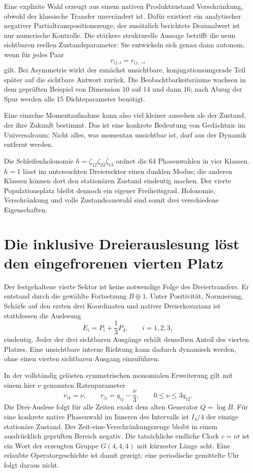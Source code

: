 Eine explizite Wahl erzeugt aus einem nativen Produktzustand Verschränkung, obwohl der klassische Transfer unverändert ist. Dafür existiert ein analytischer negativer Partialtranspositionszeuge; der zusätzlich berichtete Dezimalwert ist nur numerische Kontrolle. Die stärkere strukturelle Aussage betrifft die neun sichtbaren reellen Zustandsparameter: Sie entwickeln sich genau dann autonom, wenn für jedes Paar
\[
 r_{ij,i}=r_{ij,-i}
\]
gilt. Bei Asymmetrie wirkt der zunächst unsichtbare, konjugationsungerade Teil später auf die sichtbare Antwort zurück. Die Beobachtbarkeitsräume wachsen in dem geprüften Beispiel von Dimension $10$ auf $14$ und dann $16$; nach Abzug der Spur werden alle 15 Dichteparameter benötigt. 

Eine einzelne Momentaufnahme kann also viel kleiner aussehen als der Zustand, der ihre Zukunft bestimmt. Das ist eine konkrete Bedeutung von Gedächtnis im Universalraum: Nicht alles, was momentan unsichtbar ist, darf aus der Dynamik entfernt werden.

Die Schleifenholonomie $h=\zeta_{12}\zeta_{23}\overline{\zeta}_{13}$ ordnet die 64 Phasenwahlen in vier Klassen. $h=1$ lässt im untersuchten Dreiersektor einen dunklen Modus; die anderen Klassen können dort den stationären Zustand eindeutig machen. Der vierte Populationsplatz bleibt dennoch ein eigener Freiheitsgrad. Holonomie, Verschränkung und volle Zustandsauswahl sind somit drei verschiedene Eigenschaften. 

\section{Die inklusive Dreierauslesung löst den eingefrorenen vierten Platz}
Der festgehaltene vierte Sektor ist keine notwendige Folge des Dreiertransfers. Er entstand durch die gewählte Fortsetzung $B\oplus1$. Unter Positivität, Normierung, Schärfe auf den ersten drei Koordinaten und nativer Dreierkovarianz ist stattdessen die Auslesung
\[
 E_i=P_i+\frac13P_4,\qquad i=1,2,3,
\]
eindeutig. Jeder der drei sichtbaren Ausgänge erhält denselben Anteil des vierten Platzes. Eine unsichtbare interne Richtung kann dadurch dynamisch werden, ohne einen vierten sichtbaren Ausgang einzuführen. 

In der vollständig gelösten symmetrischen monomialen Erweiterung gilt mit einem hier $\nu$ genannten Ratenparameter
\[
 r_{i4}=\nu,\qquad r_{ij}=q_{ij}-\frac\nu3,\qquad
 0\le\nu\le3q_{12}.
\]
Die Drei-Auslese folgt für alle Zeiten exakt dem alten Generator $Q=\log B$. Für eine konkrete native Phasenwahl im Inneren des Intervalls ist $I_4/4$ der einzige stationäre Zustand. Der Zeit-eins-Verschränkungszeuge bleibt in einem ausdrücklich geprüften Bereich negativ. Die tatsächliche endliche Clock $c=i\sigma$ ist ein Wort der erzeugten Gruppe $G(4,4,4)$ mit kürzester Länge acht. Eine erlaubte Operatorgeschichte ist damit gezeigt; eine periodische gemittelte Uhr folgt daraus nicht. 

